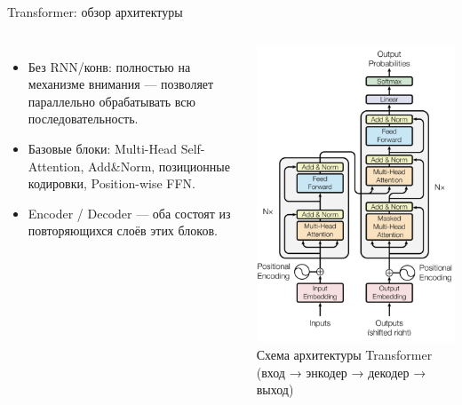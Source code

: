\documentclass[aspectratio=1610,12pt]{beamer}
\begin{document}
\begin{frame}{Transformer: обзор архитектуры}
\begin{columns}[T,onlytextwidth]
\begin{itemize}
  \item Без RNN/конв: полностью на механизме внимания — позволяет параллельно обрабатывать всю последовательность.
  \item Базовые блоки: Multi-Head Self-Attention, Add\&Norm, позиционные кодировки, Position-wise FFN.
  \item Encoder / Decoder — оба состоят из повторяющихся слоёв этих блоков.
\end{itemize}
\centering
\includegraphics[width=\linewidth]{transformer.png}\\
\footnotesize Схема архитектуры Transformer (вход → энкодер → декодер → выход)
\end{columns}
\end{frame}
\end{document}
